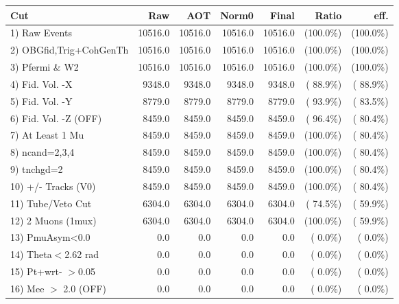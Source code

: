  \begin{table}[h!]\centering
 \begin{tabular}{||l||r|r|r|r|r|r||}
 \hline
 \hline
 Cut & Raw & AOT & Norm0 & Final & Ratio & eff.       \\
 \hline
  1) Raw Events           &      10516.0 &      10516.0 &      10516.0 &      10516.0 & (100.0\%) & (100.0\%) \\
  2) OBGfid,Trig+CohGenTh &      10516.0 &      10516.0 &      10516.0 &      10516.0 & (100.0\%) & (100.0\%) \\
  3) Pfermi \& W2         &      10516.0 &      10516.0 &      10516.0 &      10516.0 & (100.0\%) & (100.0\%) \\
  4) Fid. Vol. -X         &       9348.0 &       9348.0 &       9348.0 &       9348.0 & ( 88.9\%) & ( 88.9\%) \\
  5) Fid. Vol. -Y         &       8779.0 &       8779.0 &       8779.0 &       8779.0 & ( 93.9\%) & ( 83.5\%) \\
  6) Fid. Vol. -Z (OFF)   &       8459.0 &       8459.0 &       8459.0 &       8459.0 & ( 96.4\%) & ( 80.4\%) \\
  7) At Least 1 Mu        &       8459.0 &       8459.0 &       8459.0 &       8459.0 & (100.0\%) & ( 80.4\%) \\
  8) ncand=2,3,4          &       8459.0 &       8459.0 &       8459.0 &       8459.0 & (100.0\%) & ( 80.4\%) \\
  9) tnchgd=2             &       8459.0 &       8459.0 &       8459.0 &       8459.0 & (100.0\%) & ( 80.4\%) \\
 10) +/- Tracks (V0)      &       8459.0 &       8459.0 &       8459.0 &       8459.0 & (100.0\%) & ( 80.4\%) \\
 11) Tube/Veto Cut        &       6304.0 &       6304.0 &       6304.0 &       6304.0 & ( 74.5\%) & ( 59.9\%) \\
 12) 2 Muons (1mux)       &       6304.0 &       6304.0 &       6304.0 &       6304.0 & (100.0\%) & ( 59.9\%) \\
 13) PmuAsym<0.0          &          0.0 &          0.0 &          0.0 &          0.0 & (  0.0\%) & (  0.0\%) \\
 14) Theta$<$2.62 rad     &          0.0 &          0.0 &          0.0 &          0.0 & (  0.0\%) & (  0.0\%) \\
 15) Pt+wrt- $>$0.05      &          0.0 &          0.0 &          0.0 &          0.0 & (  0.0\%) & (  0.0\%) \\
 16) Mee $>$ 2.0  (OFF)   &          0.0 &          0.0 &          0.0 &          0.0 & (  0.0\%) & (  0.0\%) \\

\end{tabular}
\end{table}
